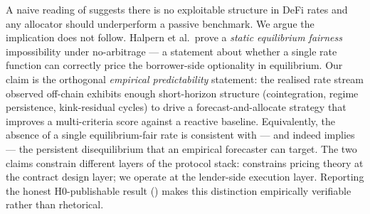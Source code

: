 A naive reading of \cite{halpern2024fair} suggests there is no
exploitable structure in DeFi rates and any allocator should
underperform a passive benchmark. We argue the implication does not
follow.  Halpern et al.\ prove a \emph{static equilibrium fairness}
impossibility under no-arbitrage --- a statement about whether a
single rate function can correctly price the borrower-side optionality
in equilibrium.  Our claim is the orthogonal \emph{empirical
predictability} statement: the realised rate stream observed off-chain
exhibits enough short-horizon structure (cointegration, regime
persistence, kink-residual cycles) to drive a forecast-and-allocate
strategy that improves a multi-criteria score against a reactive
baseline.  Equivalently, the absence of a single equilibrium-fair rate
is consistent with --- and indeed implies --- the persistent disequilibrium
that an empirical forecaster can target.  The two claims constrain
different layers of the protocol stack: \cite{halpern2024fair} constrains
pricing theory at the contract design layer; we operate at the
lender-side execution layer.  Reporting the honest H0-publishable result
() makes this distinction empirically verifiable
rather than rhetorical.
